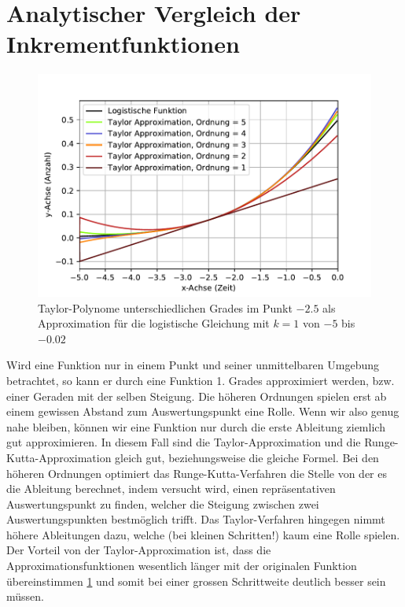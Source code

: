 \section{Analytischer Vergleich der Inkrementfunktionen
\label{taylor:subsection:VergleichInkrementft}}
\begin{figure}
\begin{center}
\includegraphics[width=12cm]{papers/taylor/taylorPictures/TaylorFunktion.pdf}
\caption{Taylor-Polynome unterschiedlichen Grades im Punkt $-2.5$ als
Approximation für die logistische Gleichung mit $k=1$ von $-5$ bis $-0.02$}
\label{taylor:section:fig:TaylorFunktion}
\end{center}
\end{figure}%
Wird eine Funktion nur in einem Punkt und seiner unmittelbaren Umgebung betrachtet, so kann er durch eine Funktion 1. Grades approximiert werden, bzw. einer Geraden mit der selben Steigung.
Die höheren Ordnungen spielen erst ab einem gewissen Abstand zum Auswertungspunkt eine Rolle.
Wenn wir also genug nahe bleiben, können wir eine Funktion nur durch die erste Ableitung ziemlich gut approximieren.
In diesem Fall sind die Taylor-Approximation und die Runge-Kutta-Approximation gleich gut, beziehungsweise die gleiche Formel.
Bei den höheren Ordnungen optimiert das Runge-Kutta-Verfahren die Stelle von der es die Ableitung berechnet, indem versucht wird, einen repräsentativen Auswertungspunkt zu finden, welcher die Steigung zwischen zwei Auswertungspunkten bestmöglich trifft.
Das Taylor-Verfahren hingegen nimmt höhere Ableitungen dazu, welche (bei kleinen Schritten!) kaum eine Rolle spielen. 
Der Vorteil von der Taylor-Approximation ist, dass die Approximationsfunktionen wesentlich länger mit der originalen Funktion übereinstimmen \ref{taylor:section:fig:TaylorFunktion} und somit bei einer grossen Schrittweite deutlich besser sein müssen.

